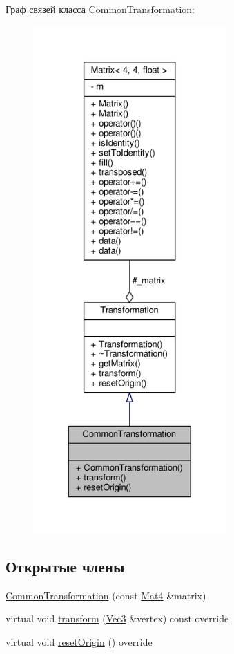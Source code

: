 Граф связей класса Common\+Transformation\+:
\nopagebreak
\begin{figure}[H]
\begin{center}
\leavevmode
\includegraphics[height=550pt]{dc/d0d/class_common_transformation__coll__graph}
\end{center}
\end{figure}
\subsection*{Открытые члены}
\begin{DoxyCompactItemize}
\item 
\hyperlink{class_common_transformation_a6482f70fab18b0afa41bc9b2f1b56665}{Common\+Transformation} (const \hyperlink{matrix_8h_a077dce9756976f552e5703c34475d5e3}{Mat4} \&matrix)
\item 
virtual void \hyperlink{class_common_transformation_a7daef5b3ad4576a691b474d888c3dfd5}{transform} (\hyperlink{vec3_8h_a221ad8ea4d9be4111628ee1ca22ee3ba}{Vec3} \&vertex) const override
\item 
virtual void \hyperlink{class_common_transformation_a8f789aa59517fd1bf553e1846241eacc}{reset\+Origin} () override
\end{DoxyCompactItemize}
